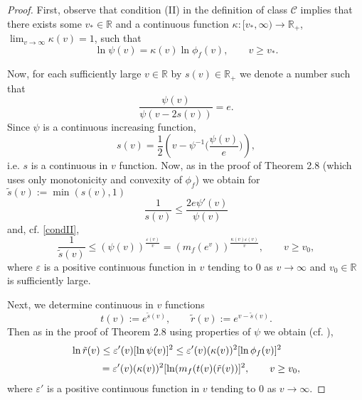 \documentclass[11pt, oneside]{amsart}
\begin{document}
\begin{proof}
First, observe that condition (II) in the definition of class $\mathscr C$ implies that
there exists some $v_*\in\mathbb R$ and a continuous function $\kappa : [v_*,\infty)\rightarrow \mathbb R_+$, $\lim_{v\rightarrow\infty}\kappa(v)=1$, such that
\begin{equation}\label{condII}
\ln\psi(v)=\kappa(v)\ln\phi_f(v),\qquad v\ge v_*.
\end{equation}

Now, for each sufficiently large $v\in\mathbb R$ by $s(v)\in\mathbb R_+$ we denote a number such that
\begin{equation}\label{equ6.36}
\frac{\psi(v)}{\psi(v-2s(v))}=e.
\end{equation}
Since $\psi$ is a continuous increasing function,
\[
s(v)=\frac 12 \left(v-\psi^{-1}\bigl(\mbox{$\frac{\psi(v)}{e}$}\bigr)\right),
\]
i.e. $s$ is a continuous in $v$ function. Now, as in the proof of Theorem 2.8 (which uses only monotonicity and convexity of  $\phi_f$) we obtain for $\tilde s(v):=\min(s(v),1)$
\[
\frac{1}{s(v)}\le\frac{2e\psi'(v)}{\psi(v)}
\]
and, cf. \eqref{condII},
\begin{equation}\label{equ6.37}
\frac{1}{\tilde s(v)}\le (\psi(v))^{\frac{\varepsilon(v)}{v}}=(m_f(e^v))^{\frac{\kappa(v)\varepsilon(v)}{v}},\qquad v\ge v_0,
\end{equation}
where $\varepsilon$ is a positive continuous function in $v$ tending to $0$ as $v\rightarrow\infty$ and $v_0 \in \mathbb R$ is sufficiently large.

Next, we determine continuous in $v$ functions
\[
t(v):=e^{\tilde s(v)},\qquad \tilde r(v):=e^{v-\tilde s(v)}.
\]
Then as in the proof of Theorem 2.8 using properties of $\psi$ we obtain (cf. \cite[Eq.\,(8.36)]{B}),
\begin{equation}\label{equ6.38}
\begin{array}{l}
\displaystyle
\ln\tilde r(v)\le \varepsilon'(v)[\ln \psi(v )]^2\le \varepsilon'(v)(\kappa(v))^2[\ln\phi_f(v)]^2\medskip\\
\displaystyle
\quad\qquad = \varepsilon'(v)(\kappa(v))^2 [\ln(m_f(t(v)(\tilde r(v))]^2,\qquad v\ge v_0,
\end{array}
\end{equation}
where $\varepsilon'$ is a positive continuous function in $v$ tending to $0$ as $v\rightarrow\infty$.


\end{proof}
\end{document}
